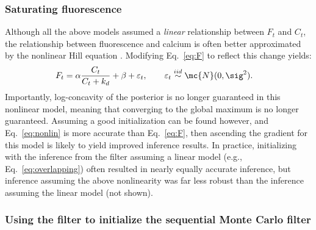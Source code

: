 \subsubsection{Saturating fluorescence}

Although all the above models assumed a \emph{linear} relationship between $F_t$ and $C_t$, the relationship between fluorescence and calcium is often better approximated by the nonlinear Hill equation \cite{PologrutoSvoboda04}. Modifying Eq.~\eqref{eq:F} to reflect this change yields: 
\begin{align} \label{eq:nonlin}
	F_t &= \alpha \frac{C_t}{C_t+k_d} + \beta +  \varepsilon_t, \qquad \varepsilon_t \overset{iid}{\sim} \mc{N}(0,\sig^2).
\end{align}
Importantly, log-concavity of the posterior is no longer guaranteed in this nonlinear model, meaning that converging to the global maximum is no longer guaranteed.  Assuming a good initialization can be found however, and Eq.~\eqref{eq:nonlin} is more accurate than Eq.~\eqref{eq:F}, then ascending the gradient for this model is likely to yield improved inference results.  In practice, initializing with the  inference from the \foopsi filter assuming a linear model (e.g., Eq.~\eqref{eq:overlapping}) often resulted in nearly equally accurate inference, but inference assuming the above nonlinearity was far less robust than the inference assuming the linear model (not shown).  

\subsubsection{Using the \foopsi filter to initialize the sequential Monte Carlo filter}

